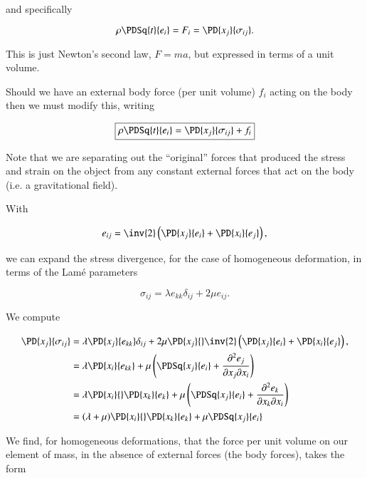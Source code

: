 and specifically

\begin{equation}\label{eqn:continuumL6:150}
\rho \PDSq{t}{e_i} = F_i = \PD{x_j}{\sigma_{ij}}.
\end{equation}

This is just Newton's second law, $F = ma$, but expressed in terms of a unit volume.

Should we have an external body force (per unit volume) $f_i$ acting on the body then we must modify this, writing

\begin{equation}\label{eqn:continuumL6:170}
\boxed{
\rho \PDSq{t}{e_i} = \PD{x_j}{\sigma_{ij}} + f_i
}
\end{equation}

Note that we are separating out the ``original'' forces that produced the stress and strain on the object from any constant external forces that act on the body (i.e. a gravitational field).

With 

\begin{equation}\label{eqn:continuumL6:190}
e_{ij} = 
\inv{2} \left( 
\PD{x_j}{e_i}
+ \PD{x_i}{e_j} \right),
\end{equation}

we can expand the stress divergence, for the case of homogeneous deformation, in terms of the Lam\'e parameters

\begin{equation}\label{eqn:continuumL6:210}
\sigma_{ij} = \lambda e_{kk} \delta_{ij} + 2 \mu e_{ij}.
\end{equation}

We compute

\begin{align*}
\PD{x_j}{\sigma_{ij}}
&=
\lambda 
\PD{x_j}{
e_{kk}
}
\delta_{ij} + 2 \mu 
\PD{x_j}{
}
\inv{2} \left( 
\PD{x_j}{e_i}
+ \PD{x_i}{e_j} \right),
 \\
&=
\lambda 
\PD{x_i}{
e_{kk}
}
+ \mu 
\left(
\PDSq{x_j}{
e_{i}
}
+
\frac{\partial^2 e_{j} }{ \partial x_j \partial x_i}
\right) \\
&=
\lambda 
\PD{x_i}{
}
\PD{x_k}{e_k}
+ \mu 
\left(
\PDSq{x_j}{
e_{i}
}
+
\frac{\partial^2 e_{k} }{ \partial x_k \partial x_i}
\right) \\
&=
(\lambda + \mu)
\PD{x_i}{
}
\PD{x_k}{e_k}
+ \mu 
\PDSq{x_j}{
e_{i}
}
\end{align*}

%
%
We find, for homogeneous deformations, that the force per unit volume on our element of mass, in the absence of external forces (the body forces), takes the form
%

